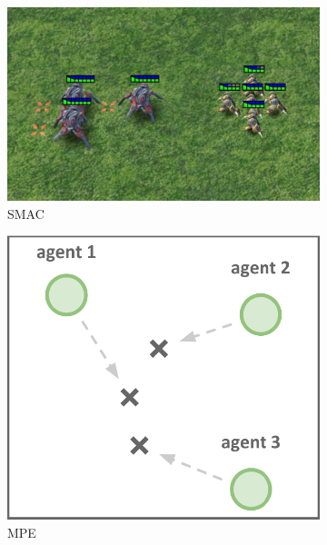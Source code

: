 \begin{figure}
    \centering
    \begin{subfigure}[c]{0.35\textwidth}
        \centering
        \includegraphics[width=\textwidth]{Figures/MADRL/smac.png}
        \caption{SMAC}
        \label{fig:SMAC}
    \end{subfigure}
    \hfill
    \begin{subfigure}[c]{0.24\textwidth}
        \centering
        \includegraphics[width=\textwidth]{Figures/MADRL/mpe.png}
        \caption{MPE}
        \label{fig:MPE}
    \end{subfigure}
    \hfill
    \begin{subfigure}[c]{0.225\textwidth}

\end{subfigure}
\end{figure}
